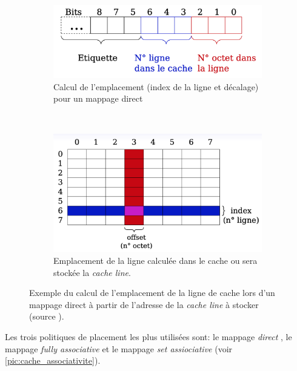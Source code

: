 \begin{figure}
    \centering
    \begin{subfigure}[b]{0.45\linewidth}
        \includegraphics[width=\linewidth]{images/cache_calcul.png}
        \caption{Calcul de l'emplacement (index de la ligne et décalage) pour un mappage direct}
        \label{pic:cache_calcul}
    \end{subfigure}
    ~ %
    \begin{subfigure}[b]{0.45\linewidth}
        \includegraphics[width=\linewidth]{images/cache_direct.png}
        \caption{Emplacement de la ligne calculée dans le cache ou sera stockée la \textit{cache line}.}
        \label{pic:cache_direct}
    \end{subfigure}
    \caption{Exemple du calcul de l'emplacement de la ligne de cache lors d'un mappage direct à partir de l'adresse de la \textit{cache line} à stocker (source \cite{Meunier2017}). }\label{fig:cacheinclusionpolicy}
\end{figure}





Les trois politiques de placement les plus utilisées sont: le mappage  \textit{direct }, le mappage \textit{fully associative} et le mappage \textit{set assiociative} (voir \autoref{pic:cache_associativite}).


